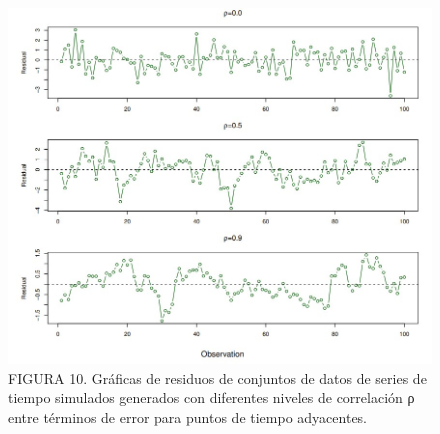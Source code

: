 \documentclass[
  letterpaper,
  DIV=11,
  numbers=noendperiod]{scrartcl}
\begin{document}
\begin{figure}

{\centering \includegraphics{images/fr.jpg}

}

\caption{FIGURA 10. Gráficas de residuos de conjuntos de datos de series
de tiempo simulados generados con diferentes niveles de correlación ρ
entre términos de error para puntos de tiempo adyacentes.}

\end{figure}
\end{document}
